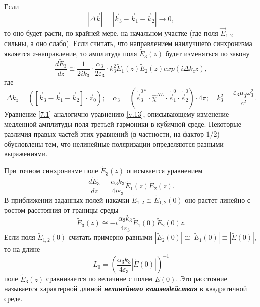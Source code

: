 \documentclass[a4paper]{article}
\begin{document}
	Если $$\left|\Delta\vec{k}\right|=\left|\vec{k}_{3}-\vec{k}_{1}-\vec{k}_{2}\right|\rightarrow0,$$
	то оно будет расти, по крайней мере, на начальном участке (где поля $\vec{E}_{1,2}$ сильны, а оно слабо). Если считать, что направлением наилучшего синхронизма является  $z$-направление, то амплитуда поля $\tilde{E}_{3}(z)$ будет изменяться по закону 
	\begin{equation}
		\frac{d\tilde{E}_{3}}{dz}\cong\frac{1}{2ik_{3}}\cdot\frac{\alpha_{3}}{2\varepsilon_{3}}\cdot k_{3}^{2}\tilde{E}_{1}(z)\tilde{E}_{2}(z)exp(i\Delta k_{z}z),\label{7.2}
	\end{equation}
	где
	\begin{equation}
		\Delta k_{z}=\left(\left[\vec{k}_{3}-\vec{k}_{1}-\vec{k}_{2}\right]\cdot\vec{z}_{0}\right);\quad\alpha_{3}=\left(\tilde{\vec{e}}_{3}^{0*}\cdot\hat{\chi}^{NL}\cdot\tilde{\vec{e}}_{1}^{0}\cdot\tilde{\vec{e}}_{2}^{0}\right)\cdot4\pi;\quad k_{3}^{2}=\frac{\varepsilon_{3}\mu_{3}\omega_{3}^{2}}{c^{2}}.\label{7.1}
	\end{equation}
	Уравнение \eqref{7.1} аналогично уравнению \eqref{v.13}, описывающему изменение медленной амплитуды поля третьей гармоники в кубичной среде. Некоторые различия правых частей этих уравнений (в частности, на фактор $1/2$) обусловлены тем, что нелинейные поляризации определяются разными выражениями.  
	
	При точном синхронизме поле $\tilde{E}_{3}(z)$ описывается уравнением 
	\begin{equation}
		\frac{d\tilde{E}_{3}}{dz}=\frac{\alpha_{3}k_{3}}{4i\varepsilon_{3}}\tilde{E}_{1}(z)\tilde{E}_{2}(z).\label{9}
	\end{equation}
	В приближении заданных полей накачки $\tilde{E}_{1,2}\cong\tilde{E}_{1,2}(0)$ оно растет линейно с ростом расстояния от границы среды 
	\begin{equation}
		\tilde{E}_{3}(z)\cong-i\frac{\alpha_{3}k_{3}}{4\varepsilon_{3}}\tilde{E}_{1}(0)\tilde{E}_{2}(0)z.
	\end{equation}
 	Если поля $\tilde{E}_{1,2}(0)$ считать примерно равными $\left|\tilde{E}_{2}(0)\right|\cong\left|\tilde{E}_{1}(0)\right|\equiv\left|\tilde{E}(0)\right|$, то на длине
 	\begin{equation}
 		L_{0}=\left(\frac{\alpha_{3}k_{3}}{4\varepsilon_{3}}\left|\tilde{E}(0)\right|\right)^{-1}
 	\end{equation}
 	поле $\tilde{E}_{3}(z)$ сравнивается по величине с полем $\tilde{E}(0)$. Это расстояние называется характерной длиной \textbf{\textit{нелинейного взаимодействия}} в квадратичной среде.
 	
\end{document}
